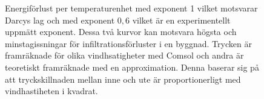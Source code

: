 \begin{figure}
\centering
{}
\vspace{5mm}

\caption{Energiförlust per temperaturenhet med exponent 1 vilket motsvarar
Darcys lag och med exponent $0,6$ vilket är en experimentellt uppmätt
exponent. Dessa två kurvor kan motsvara högsta och minstagissningar för
infiltrationsförluster i en byggnad. Trycken är framräknade för olika
vindhsatigheter med Comsol och andra är teoretiskt framräknade med en approximation.
Denna baserar sig på att tryckskillnaden mellan inne och ute är proportionerligt
med vindhastiheten i kvadrat.}
\end{figure}
